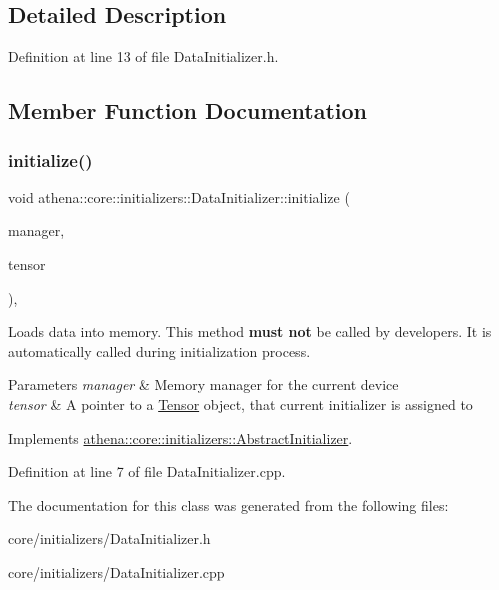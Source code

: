 \subsection{Detailed Description}


Definition at line 13 of file Data\+Initializer.\+h.



\subsection{Member Function Documentation}
\mbox{\label{classathena_1_1core_1_1initializers_1_1_data_initializer_a984213526b2741e423f230098c71520a}} 
\subsubsection{\texorpdfstring{initialize()}{initialize()}}
{\footnotesize\ttfamily void athena\+::core\+::initializers\+::\+Data\+Initializer\+::initialize (\begin{DoxyParamCaption}\item[{\mbox{\hyperlink{classathena_1_1backend_1_1_abstract_memory_manager}{athena\+::backend\+::\+Abstract\+Memory\+Manager}} $\ast$}]{manager,  }\item[{\mbox{\hyperlink{classathena_1_1core_1_1_tensor}{Tensor}} $\ast$}]{tensor }\end{DoxyParamCaption})\hspace{0.3cm}{\ttfamily [override]}, {\ttfamily [virtual]}}

Loads data into memory. This method {\bfseries must not} be called by developers. It is automatically called during initialization process. 
\begin{DoxyParams}{Parameters}
{\em manager} & Memory manager for the current device \\
\hline
{\em tensor} & A pointer to a \mbox{\hyperlink{classathena_1_1core_1_1_tensor}{Tensor}} object, that current initializer is assigned to \\
\hline
\end{DoxyParams}


Implements \mbox{\hyperlink{classathena_1_1core_1_1initializers_1_1_abstract_initializer_a9c0f0c57add306c9da8ffe8797532f62}{athena\+::core\+::initializers\+::\+Abstract\+Initializer}}.



Definition at line 7 of file Data\+Initializer.\+cpp.



The documentation for this class was generated from the following files\+:\begin{DoxyCompactItemize}
\item 
core/initializers/Data\+Initializer.\+h\item 
core/initializers/Data\+Initializer.\+cpp\end{DoxyCompactItemize}
